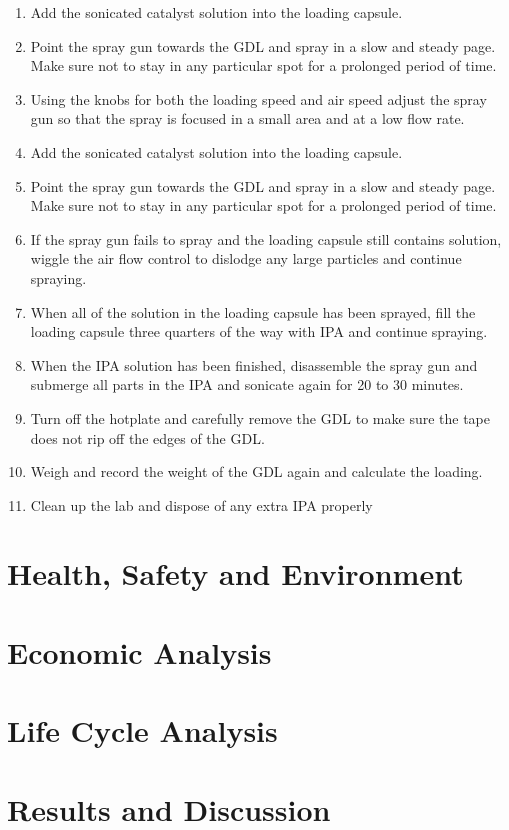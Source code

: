 \documentclass{article}
\begin{document}
\begin{enumerate}
        \item Add the sonicated catalyst solution into the loading capsule.
        \item Point the spray gun towards the GDL and spray in a slow and steady page. Make sure not to stay in any particular spot for a prolonged period of time.
        \item Using the knobs for both the loading speed and air speed adjust the spray gun so that the spray is focused in a small area and at a low flow rate.
        \item Add the sonicated catalyst solution into the loading capsule.
        \item Point the spray gun towards the GDL and spray in a slow and steady page. Make sure not to stay in any particular spot for a prolonged period of time.
        \item If the spray gun fails to spray and the loading capsule still contains solution, wiggle the air flow control to dislodge any large particles and continue spraying.
        \item When all of the solution in the loading capsule has been sprayed, fill the loading capsule three quarters of the way with IPA and continue spraying.
        \item When the IPA solution has been finished, disassemble the spray gun and submerge all parts in the IPA and sonicate again for 20 to 30 minutes.
        \item Turn off the hotplate and carefully remove the GDL to make sure the tape does not rip off the edges of the GDL.
        \item Weigh and record the weight of the GDL again and calculate the loading.
        \item Clean up the lab and dispose of any extra IPA properly
			\end{enumerate}
\pagebreak
\section{Health, Safety and Environment}
\section{Economic Analysis}
\section{Life Cycle Analysis}
\pagebreak
\section{Results and Discussion}
\end{document}
